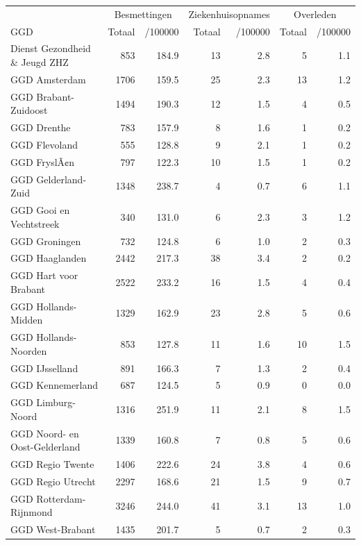 \documentclass[
  english,
  man,floatsintext]{apa6}
\begin{document}
\begin{table}
\centering\begingroup\fontsize{10}{12}\selectfont

\begin{threeparttable}
\begin{tabular}{lrrrrrr}
\toprule
\multicolumn{1}{c}{ } & \multicolumn{2}{c}{Besmettingen} & \multicolumn{2}{c}{Ziekenhuisopnames} & \multicolumn{2}{c}{Overleden} \\
\cmidrule(l{3pt}r{3pt}){2-3} \cmidrule(l{3pt}r{3pt}){4-5} \cmidrule(l{3pt}r{3pt}){6-7}
GGD & Totaal & /100000 & Totaal & /100000 & Totaal & /100000\\
\midrule
Dienst Gezondheid \& Jeugd ZHZ & 853 & 184.9 & 13 & 2.8 & 5 & 1.1\\
GGD Amsterdam & 1706 & 159.5 & 25 & 2.3 & 13 & 1.2\\
GGD Brabant-Zuidoost & 1494 & 190.3 & 12 & 1.5 & 4 & 0.5\\
GGD Drenthe & 783 & 157.9 & 8 & 1.6 & 1 & 0.2\\
GGD Flevoland & 555 & 128.8 & 9 & 2.1 & 1 & 0.2\\
GGD FryslÃ¢n & 797 & 122.3 & 10 & 1.5 & 1 & 0.2\\
GGD Gelderland-Zuid & 1348 & 238.7 & 4 & 0.7 & 6 & 1.1\\
GGD Gooi en Vechtstreek & 340 & 131.0 & 6 & 2.3 & 3 & 1.2\\
GGD Groningen & 732 & 124.8 & 6 & 1.0 & 2 & 0.3\\
GGD Haaglanden & 2442 & 217.3 & 38 & 3.4 & 2 & 0.2\\
GGD Hart voor Brabant & 2522 & 233.2 & 16 & 1.5 & 4 & 0.4\\
GGD Hollands-Midden & 1329 & 162.9 & 23 & 2.8 & 5 & 0.6\\
GGD Hollands-Noorden & 853 & 127.8 & 11 & 1.6 & 10 & 1.5\\
GGD IJsselland & 891 & 166.3 & 7 & 1.3 & 2 & 0.4\\
GGD Kennemerland & 687 & 124.5 & 5 & 0.9 & 0 & 0.0\\
GGD Limburg-Noord & 1316 & 251.9 & 11 & 2.1 & 8 & 1.5\\
GGD Noord- en Oost-Gelderland & 1339 & 160.8 & 7 & 0.8 & 5 & 0.6\\
GGD Regio Twente & 1406 & 222.6 & 24 & 3.8 & 4 & 0.6\\
GGD Regio Utrecht & 2297 & 168.6 & 21 & 1.5 & 9 & 0.7\\
GGD Rotterdam-Rijnmond & 3246 & 244.0 & 41 & 3.1 & 13 & 1.0\\
GGD West-Brabant & 1435 & 201.7 & 5 & 0.7 & 2 & 0.3\\

\end{tabular}
\end{threeparttable}
\end{table}
\end{document}
